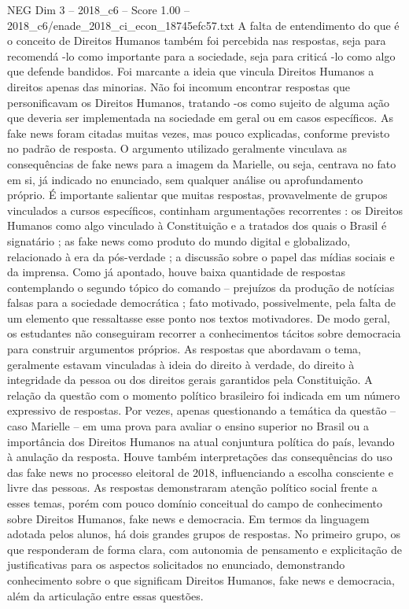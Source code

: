 \begin{textsample}{NEG Dim 3 – 2018\_c6 – Score 1.00 – 2018\_c6/enade\_2018\_ci\_econ\_18745efc57.txt}
A falta de entendimento do que é o conceito de Direitos Humanos também foi percebida nas respostas, seja para recomendá -lo como importante para a sociedade, seja para criticá -lo como algo que defende bandidos.
Foi marcante a ideia que vincula Direitos Humanos a direitos apenas das minorias.
Não foi incomum encontrar respostas que personificavam os Direitos Humanos, tratando -os como sujeito de alguma ação que deveria ser implementada na sociedade em geral ou em casos específicos.
As fake news foram citadas muitas vezes, mas pouco explicadas, conforme previsto no padrão de resposta.
O argumento utilizado geralmente vinculava as consequências de fake news para a imagem da Marielle, ou seja, centrava no fato em si, já indicado no enunciado, sem qualquer análise ou aprofundamento próprio.
É importante salientar que muitas respostas, provavelmente de grupos vinculados a cursos específicos, continham argumentações recorrentes : os Direitos Humanos como algo vinculado à Constituição e a tratados dos quais o Brasil é signatário ; as fake news como produto do mundo digital e globalizado, relacionado à era da pós-verdade ; a discussão sobre o papel das mídias sociais e da imprensa.
Como já apontado, houve baixa quantidade de respostas contemplando o segundo tópico do comando – prejuízos da produção de notícias falsas para a sociedade democrática ; fato motivado, possivelmente, pela falta de um elemento que ressaltasse esse ponto nos textos motivadores.
De modo geral, os estudantes não conseguiram recorrer a conhecimentos tácitos sobre democracia para construir argumentos próprios.
As respostas que abordavam o tema, geralmente estavam vinculadas à ideia do direito à verdade, do direito à integridade da pessoa ou dos direitos gerais garantidos pela Constituição.
A relação da questão com o momento político brasileiro foi indicada em um número expressivo de respostas.
Por vezes, apenas questionando a temática da questão – caso Marielle – em uma prova para avaliar o ensino superior no Brasil ou a importância dos Direitos Humanos na atual conjuntura política do país, levando à anulação da resposta.
Houve também interpretações das consequências do uso das fake news no processo eleitoral de 2018, influenciando a escolha consciente e livre das pessoas.
As respostas demonstraram atenção político social frente a esses temas, porém com pouco domínio conceitual do campo de conhecimento sobre Direitos Humanos, fake news e democracia.
Em termos da linguagem adotada pelos alunos, há dois grandes grupos de respostas.
No primeiro grupo, os que responderam de forma clara, com autonomia de pensamento e explicitação de justificativas para os aspectos solicitados no enunciado, demonstrando conhecimento sobre o que significam Direitos Humanos, fake news e democracia, além da articulação entre essas questões.

\end{textsample}
